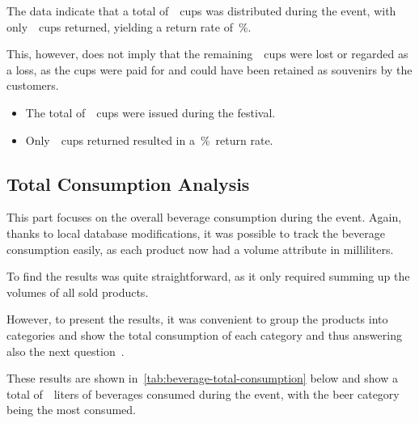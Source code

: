 The data indicate that a total of~~cups was distributed during the event, with only~~cups returned, yielding a return rate of~\%.

This, however, does not imply that the remaining~~cups were lost or regarded as a loss, as the cups were paid for and could have been retained as souvenirs by the customers.

\begin{keytakeaways}
	\begin{itemize}
		\item The total of~~cups were issued during the festival.
		\item Only~~cups returned resulted in a~\%~return rate.
	\end{itemize}
\end{keytakeaways}


\subsection{Total Consumption Analysis}
\label{subsec:analysis-beverage-total-consumption}

This part focuses on the overall beverage consumption during the event.
Again, thanks to local database modifications, it was possible to track the beverage consumption easily, as each product now had a volume attribute in milliliters.


To find the results was quite straightforward, as it only required summing up the volumes of all sold products.

However, to present the results, it was convenient to group the products into categories and show the total consumption of each category and thus answering also the next question~.


These results are shown in~\autoref{tab:beverage-total-consumption} below and show a total of~~liters of beverages consumed during the event, with the beer category being the most consumed.

